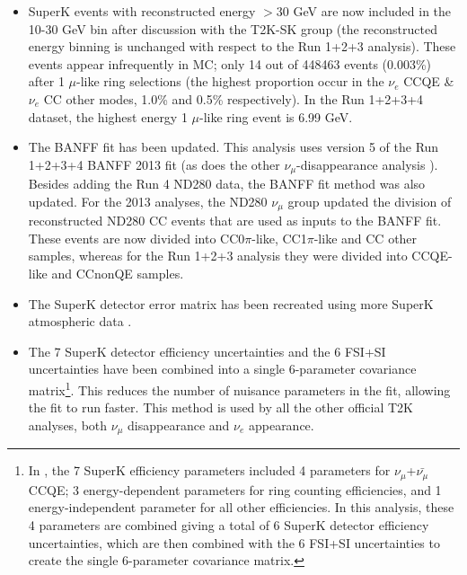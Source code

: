 \begin{itemize}
\item
SuperK events with reconstructed energy $>$30 GeV are now included in the 10-30 GeV bin after discussion with the T2K-SK group 
(the reconstructed energy binning is unchanged with respect to the Run 1+2+3 analysis).
These events appear infrequently in MC;
only 14 out of 448463 events (0.003\%) after 1 $\mu$-like ring selections 
(the highest proportion occur in the $\nu_e$ CCQE \& $\nu_e$ CC other
modes, 1.0\% and 0.5\% respectively).
In the Run 1+2+3+4 dataset, the highest energy 1 $\mu$-like ring event is 6.99 GeV.

\item 
The BANFF fit has been updated.
This analysis uses version 5 of the Run 1+2+3+4 BANFF 2013 fit \cite{BANFF2013} (as does the other $\nu_{\mu}$-disappearance 
analysis \cite{KDIRun1234DisappAnalysis}).
Besides adding the Run 4 ND280 data, the BANFF fit method was also updated.
For the 2013 analyses, the ND280 $\nu_{\mu}$ group updated the division of reconstructed ND280 CC events that are used as 
inputs to the BANFF fit.
These events are now divided into CC0$\pi$-like, CC1$\pi$-like and CC other samples,
whereas for the Run 1+2+3 analysis they were divided into CCQE-like and CCnonQE samples.

\item 
The SuperK detector error matrix has been recreated using more SuperK atmospheric data \cite{SuperkErrors2013}.

\item 
  The 7 SuperK detector efficiency uncertainties and the 6 FSI+SI uncertainties have been combined into a single 6-parameter
  covariance matrix\footnote{
    In \cite{OurRun123DisappAnalysis3Flavour}, the 7 SuperK efficiency parameters included 4 parameters for $\nu_\mu$+$\bar{\nu_\mu}$ CCQE;
    3 energy-dependent parameters for ring counting efficiencies, and 1 energy-independent parameter for all other efficiencies.
    In this analysis, these 4 parameters are combined giving a total of 6 SuperK detector efficiency uncertainties,
    which are then combined with the 6 FSI+SI uncertainties to create the single 6-parameter
    covariance matrix.
  }.
  This reduces the number of nuisance parameters in the fit, allowing the fit to run faster.
  This method is used by all the other official T2K analyses, both $\nu_\mu$ disappearance and $\nu_e$ appearance.


\end{itemize}
